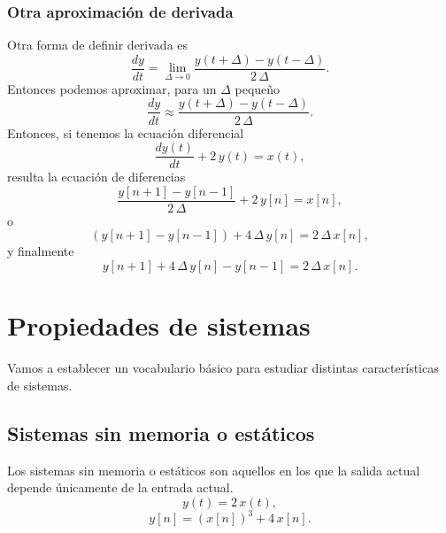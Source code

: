 \subsubsection{Otra aproximación de derivada}
Otra forma de definir derivada es
\begin{equation}
	\frac{dy}{dt} = \lim_{\Delta \rightarrow 0} \frac{y(t+\Delta) - y(t-\Delta)}{2 \, \Delta}.
\end{equation}
Entonces podemos aproximar, para un $\Delta$ pequeño
\begin{equation}
	\frac{dy}{dt} \approx \frac{y(t+\Delta) - y(t-\Delta)}{2 \, \Delta}.
\end{equation}
Entonces, si tenemos la ecuación diferencial
\begin{equation}
	\frac{dy(t)}{dt} + 2 \, y(t) = x(t),
\end{equation}
resulta la ecuación de diferencias
\begin{equation}
	\frac{y[n+1] - y[n-1]}{2 \, \Delta} + 2 \, y[n] = x[n],
\end{equation}
o
\begin{equation}
	(y[n+1] - y[n-1]) + 4 \, \Delta \, y[n] = 2 \, \Delta \, x[n],
\end{equation}
y finalmente
\begin{equation}
	y[n+1] + 4 \, \Delta \, y[n] - y[n-1] = 2 \, \Delta \, x[n].
\end{equation}


\section{Propiedades de sistemas}

Vamos a establecer un vocabulario básico para estudiar distintas características de sistemas.

\subsection{Sistemas sin memoria o estáticos}
Los sistemas sin memoria o estáticos son aquellos en los que la salida actual depende únicamente de la entrada actual.
\begin{equation}
	y(t) = 2 \, x(t),
\end{equation}
\begin{equation}
	y[n] = (x[n])^{3} + 4 \, x[n].
\end{equation}

